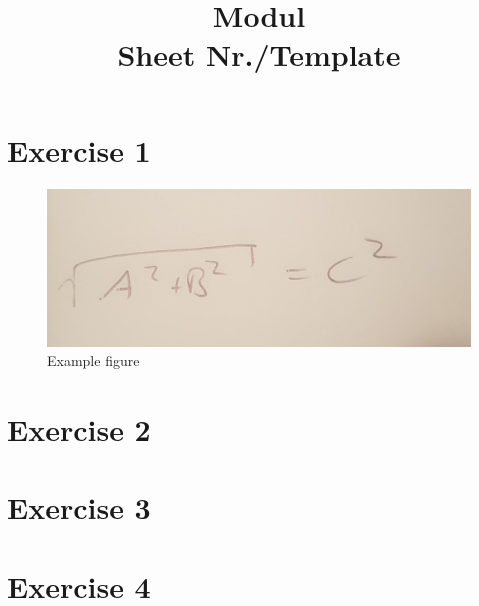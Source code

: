 \documentclass[bibliography=totocnumbered]{scrartcl}
\title{Modul\\Sheet Nr./Template}
\begin{document}
    \maketitle
    \tableofcontents
    \listoffigures
    
    \newpage
    \section{Exercise 1}
        \begin{figure}[H]
            \centering
            \includegraphics[width=\linewidth]{figures/template/example.jpeg}
            \caption{Example figure}
            \label{fig: Example}
        \end{figure}
    \newpage
    \section{Exercise 2}

    \newpage
    \section{Exercise 3}

    \newpage
    \section{Exercise 4}

    \newpage
    \appendix
    \printbibliography[title={Sources}]
\end{document}
